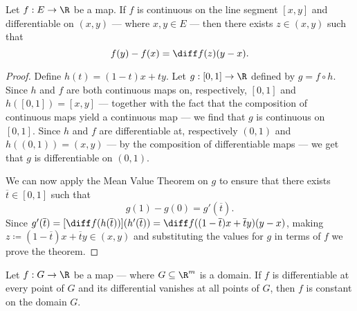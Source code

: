 \begin{theorem}
  \label{thm: several-mvt-real-val}
  Let \(f: E \to \R\) be a map. If \(f\) is continuous on the line segment \([x,
  y]\) and differentiable on \((x, y)\) --- where \(x, y \in E\) --- then there
  exists \(z \in (x, y)\) such that
  \[
    f(y) - f(x) = \diff f(z)(y - x).
  \]
\end{theorem}

\begin{proof}
  Define \(h(t) = (1 - t) x + ty\). Let \(g: [0, 1] \to \R\) defined by \(g = f
  \circ h\). Since \(h\) and \(f\) are both continuous maps on, respectively,
  \([0, 1]\) and \(h([0, 1]) = [x, y]\) --- together with the fact that the
  composition of continuous maps yield a continuous map --- we find that \(g\)
  is continuous on \([0, 1]\). Since \(h\) and \(f\) are differentiable at,
  respectively \((0, 1)\) and \(h((0, 1)) = (x, y)\) --- by the composition of
  differentiable maps --- we get that \(g\) is differentiable on \((0, 1)\).

  We can now apply the Mean Value Theorem on \(g\) to ensure that there exists
  \(\overline t \in [0, 1]\) such that
  \[
    g(1) - g(0) = g'(\overline t).
  \]
  Since \(g'(\overline t) = [\diff f(h(\overline t))](h'(\overline t)) = \diff
  f((1 -\overline t) x + \overline t y)(y - x)\), making \(z \coloneq (1 - \overline
  t)x + \overline t y \in (x, y)\) and substituting the values for \(g\) in
  terms of \(f\) we prove the theorem.
\end{proof}

\begin{corollary}\label{cor: sev-const}
  Let \(f: G \to \R\) be a map --- where \(G \subseteq \R^m\) is a domain. If
  \(f\) is differentiable at every point of \(G\) and its differential vanishes
  at all points of \(G\), then \(f\) is constant on the domain \(G\).
\end{corollary}

